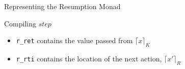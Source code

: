 \documentclass{beamer}
\begin{document}
\begin{frame}{Representing the Resumption Monad}
\begin{structure}{Compiling $step$}
\begin{center}
\begin{onlinebox}{10cm}
\begin{flushleft}
\end{flushleft}
\end{onlinebox}
\end{center}

\end{structure}

\begin{itemize}

\item{\texttt{r\_ret} contains the value passed from $\lceil x \rceil_K$}
\item{\texttt{r\_rti} contains the location of the next action, $\lceil x\prime \rceil_R$}

\end{itemize}

\end{frame}
\end{document}
